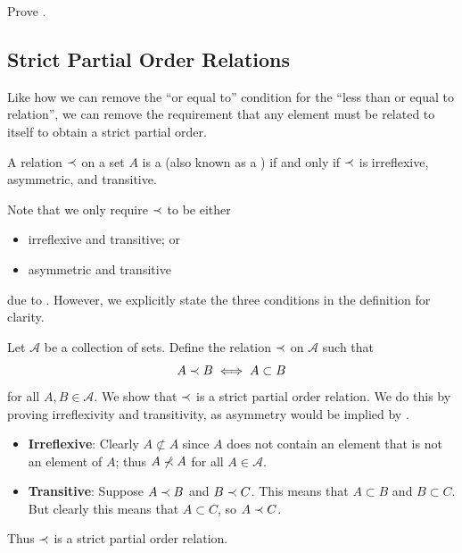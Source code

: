\begin{exercise}\label{exercise:divides-is-partial-order}
    Prove .
\end{exercise}

\subsection{Strict Partial Order Relations}
Like how we can remove the ``or equal to'' condition for the ``less than or equal to relation'', we can remove the requirement that any element must be related to itself to obtain a strict partial order.

\begin{definition}
    A relation $\prec$ on a set $A$ is a  (also known as a ) if and only if $\prec$ is irreflexive, asymmetric, and transitive.
\end{definition}
\begin{remark}
    Note that we only require $\prec$ to be either
    \begin{itemize}
        \item irreflexive and transitive; or
        \item asymmetric and transitive
    \end{itemize}
    due to . However, we explicitly state the three conditions in the definition for clarity.
\end{remark}

\begin{example}\label{example:strict-subset-strict-partial-order}
    Let $\mathcal{A}$ be a collection of sets. Define the relation $\prec$ on $\mathcal{A}$ such that
    \[
        A \prec B \iff A \subset B
    \]
    for all $A, B \in \mathcal{A}$. We show that $\prec$ is a strict partial order relation. We do this by proving irreflexivity and transitivity, as asymmetry would be implied by .
    \begin{itemize}
        \item \textbf{Irreflexive}: Clearly $A \not\subset A$ since $A$ does not contain an element that is not an element of $A$; thus $A \not\mathrel{\prec} A$ for all $A \in \mathcal{A}$.
        
        \item \textbf{Transitive}: Suppose $A \prec B$ and $B \prec C$. This means that $A \subset B$ and $B \subset C$. But clearly this means that $A \subset C$, so $A \mathrel{\prec} C$.
    \end{itemize}
    Thus $\prec$ is a strict partial order relation.
\end{example}

